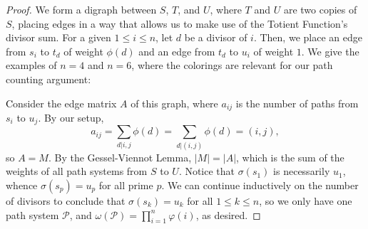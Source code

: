 \documentclass[11pt,letterpaper]{article}
\begin{document}
\begin{proof}
    We form a digraph between $S$, $T$, and $U$, where $T$ and $U$ are two copies of $S$, placing edges in a way that allows us to make use of the Totient Function's divisor sum. For a given $1\leq i\leq n$, let $d$ be a divisor of $i$. Then, we place an edge from $s_i$ to $t_d$ of weight $\phi(d)$ and an edge from $t_d$ to $u_i$ of weight $1$. We give the examples of $n=4$ and $n=6$, where the colorings  are relevant for our path counting argument:
    \begin{center}

    \end{center}
    \textcolor{black}
    Consider the edge matrix $A$ of this graph, where $a_{ij}$ is the number of paths from $s_i$ to $u_j$. By our setup, \[a_{ij}=\sum_{d|i,j}\phi(d)=\sum_{d|(i,j)}\phi(d)=(i,j),\] so $A=M$. By the Gessel-Viennot Lemma, $|M|=|A|$, which is the sum of the weights of all path systems from $S$ to $U$. Notice that $\sigma(s_1)$ is necessarily $u_1$, whence $\sigma(s_p)=u_p$ for all prime $p$. We can continue inductively on the number of divisors to conclude that $\sigma(s_k)=u_k$ for all $1\leq k\leq n$, so we only have one path system $\mathscr{P}$, and $\omega(\mathscr{P})=\prod_{i=1}^n\varphi(i)$, as desired.
\end{proof}
\end{document}
